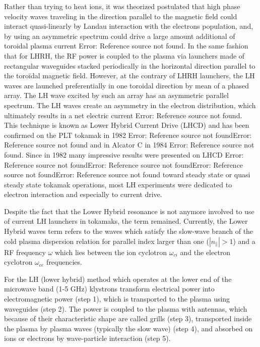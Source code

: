 Rather than trying to heat ions, it was theorized postulated that high phase velocity waves traveling in the direction parallel to the magnetic field could interact quasi-linearly by Landau interaction with the electrons population, and, by using an asymmetric spectrum could drive a large amount additional of toroidal plasma current Error: Reference source not found. In the same fashion that for LHRH, the RF power is coupled to the plasma via launchers made of rectangular waveguides stacked periodically in the horizontal direction parallel to the toroïdal magnetic field. However, at the contrary of LHRH launchers, the LH waves are launched preferentially in one toroidal direction by mean of a phased array. The LH wave excited by such an array has an asymmetric parallel spectrum. The LH waves create an asymmetry in the electron distribution, which ultimately results in a net electric current Error: Reference source not found. This technique is known as Lower Hybrid Current Drive (LHCD) and has been confirmed on the PLT tokamak in 1982 Error: Reference source not foundError: Reference source not found and in Alcator C in 1984 Error: Reference source not found. 
Since in 1982 many impressive results were presented on LHCD Error: Reference source not foundError: Reference source not foundError: Reference source not foundError: Reference source not found toward steady state or quasi steady state tokamak operations, most LH experiments were dedicated to electron interaction and especially to current drive. 

Despite the fact that the Lower Hybrid resonance is not anymore involved to use of current LH launchers in tokamaks, the term remained. Currently, the Lower Hybrid waves term refers to the waves which satisfy the slow-wave branch of the cold plasma dispersion relation for parallel index larger than one ($|n_{\parallel}|>1$) and a RF frequency $\omega$ which lies between the ion cyclotron $\omega_{ci}$ and the electron cyclotron $\omega_{ce}$ frequencies. 

For the LH (lower hybrid) method which operates at the lower end of the microwave band (1-5 GHz) klystrons transform electrical power into electromagnetic power (step 1), which is transported to the plasma using waveguides (step 2). The power is coupled to the plasma with antennas, which because of their characteristic shape are called grills (step 3), transported inside the plasma by plasma waves (typically the slow wave) (step 4), and absorbed on ions or electrons by wave-particle interaction (step 5).

